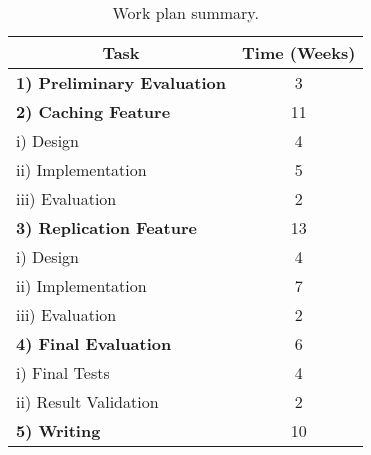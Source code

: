 \begin{table}[ht]
    \centering
\begin{tabular}{lc}
    \toprule
    \multicolumn{1}{c}{\textbf{Task}}       & \textbf{Time (Weeks)}    \\
    \midrule
                     \textbf{1) Preliminary Evaluation}                & 3  \\
     \midrule
     				\textbf{2) Caching Feature}                & 11  \\
     \midrule
                      i) Design                            & 4  \\
                      ii) Implementation                          & 5  \\
                      iii) Evaluation               & 2  \\
    \midrule
                     \textbf{3) Replication Feature}             & 13 \\
     \midrule
                      i) Design                            & 4  \\
                      ii) Implementation                          & 7  \\
                      iii) Evaluation               & 2  \\
      \midrule
               \textbf{4) Final Evaluation}             & 6 \\
     \midrule
                      i) Final Tests                            & 4  \\
                      ii) Result Validation                          & 2  \\

     \midrule
                     \textbf{5) Writing}                                 & 10 \\                
\end{tabular}
\caption{Work plan summary.}
    \label{tab:work_plan}
\end{table}
\newpage





